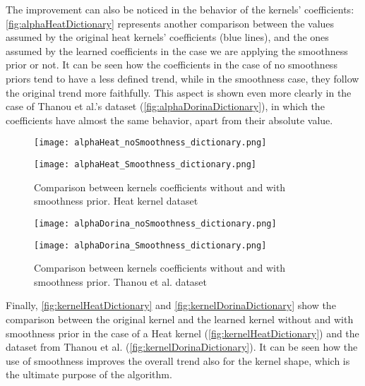 The improvement can also be noticed in the behavior of the kernels' coefficients: \autoref{fig:alphaHeatDictionary} represents another comparison between the values assumed by the original heat kernels' coefficients (blue lines), and the ones assumed by the learned coefficients in the case we are applying the smoothness prior or not. It can be seen how the coefficients in the case of no smoothness priors tend to have a less defined trend, while in the smoothness case, they follow the original trend more faithfully. This aspect is shown even more clearly in the case of Thanou et al.'s dataset (\autoref{fig:alphaDorinaDictionary}), in which the coefficients have almost the same behavior, apart from their absolute value.

\begin{figure}
  \centering
  \begin{minipage}[c]{.85\textwidth}
    \centering
    \texttt{[image: alphaHeat\_noSmoothness\_dictionary.png]}
  \end{minipage}
  \vspace{10mm}
  \begin{minipage}[c]{.85\textwidth}
    \centering
    \texttt{[image: alphaHeat\_Smoothness\_dictionary.png]}
  \end{minipage}
  \caption{Comparison between kernels coefficients without and with smoothness prior. Heat kernel   dataset}
  \label{fig:alphaHeatDictionary}
\end{figure}

\begin{figure}
  \centering
  \begin{minipage}[c]{.85\textwidth}
    \centering
    \texttt{[image: alphaDorina\_noSmoothness\_dictionary.png]}
  \end{minipage}
  \vspace{10mm}
  \begin{minipage}[c]{.85\textwidth}
    \centering
    \texttt{[image: alphaDorina\_Smoothness\_dictionary.png]}
  \end{minipage}
  \caption{Comparison between kernels coefficients without and with smoothness prior. Thanou et al. dataset}
  \label{fig:alphaDorinaDictionary}
\end{figure}


Finally, \autoref{fig:kernelHeatDictionary} and \autoref{fig:kernelDorinaDictionary} show the comparison between the original kernel and the learned kernel without and with smoothness prior in the case of a Heat kernel (\ref{fig:kernelHeatDictionary}) and the dataset from  Thanou et al. (\ref{fig:kernelDorinaDictionary}). It can be seen how the use of smoothness improves the overall trend also for the kernel shape, which is the ultimate purpose of the algorithm.

